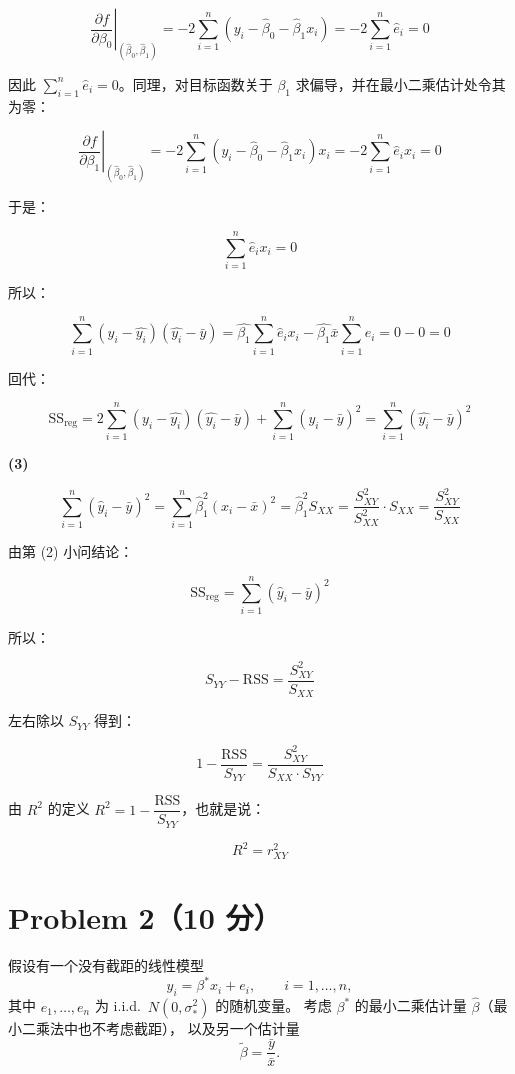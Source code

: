 \documentclass[12pt,a4paper]{article}
\begin{document}
\begin{answerbox}
$$
\left.\frac{\partial f}{\partial\beta_0}\right|_{(\hat\beta_0,\hat\beta_1)}
=-2\sum_{i=1}^n(y_i-\hat\beta_0-\hat\beta_1x_i)
=-2\sum_{i=1}^n\hat{e}_i=0
$$

因此 $\sum_{i=1}^n\hat{e}_i=0$。同理，对目标函数关于 $\beta_1$ 求偏导，并在最小二乘估计处令其为零：

$$
\left.\frac{\partial f}{\partial\beta_1}\right|_{(\hat\beta_0,\hat\beta_1)} =-2\sum_{i=1}^n (y_i-\hat\beta_0-\hat\beta_1x_i)x_i =-2\sum_{i=1}^n \hat{e}_ix_i = 0
$$

于是：

$$
\sum_{i=1}^n \hat{e}_ix_i = 0
$$

所以：

$$
\sum_{i=1}^{n}(y_i-\hat{y_i})(\hat{y_i}-\bar{y})
=\hat{\beta_1}\sum_{i=1}^{n}\hat{e}_ix_i - \hat{\beta_1}\bar{x}\sum_{i=1}^{n}\hat{e_i}
=0-0=0
$$

回代：

$$
\mathrm{SS}_{\mathrm{reg}}= 2 \sum_{i=1}^{n}(y_i-\hat{y_i})(\hat{y_i}-\bar{y}) + \sum_{i=1}^{n}(\hat{y_i}-\bar{y})^2=\sum_{i=1}^{n}(\hat{y_i}-\bar{y})^2
$$

\textbf{(3)}

$$
\sum_{i=1}^{n}(\hat{y}_i-\bar{y})^2=\sum_{i=1}^{n}\hat{\beta}_1^2(x_i-\bar{x})^2=\hat{\beta}_1^2 S_{XX}=\frac{S_{XY}^2}{S_{XX}^2}\cdot S_{XX}=\frac{S_{XY}^2}{S_{XX}}
$$

由第 (2) 小问结论：

$$
\mathrm{SS}_{\mathrm{reg}} = \sum_{i=1}^{n}(\hat{y}_i-\bar{y})^2
$$


所以：

$$
S_{YY}-\mathrm{RSS}=\frac{S_{XY}^2}{S_{XX}}
$$

左右除以 $S_{YY}$ 得到：

$$
1-\frac{\mathrm{RSS}}{S_{YY}}=\frac{S_{XY}^2}{S_{XX}\cdot S_{YY}}
$$

由 $R^2$ 的定义 $R^2=1-\dfrac{\mathrm{RSS}}{S_{YY}}$，也就是说：

$$
R^2=r^2_{XY}
$$

\end{answerbox}


\section{Problem 2（10 分）}

假设有一个没有截距的线性模型
\[
  y_i=\beta^*x_i+e_i,\qquad i=1,\ldots,n,
\]
其中 $e_1,\ldots,e_n$ 为 i.i.d.\ $N(0,\sigma_*^2)$ 的随机变量。
考虑 $\beta^*$ 的最小二乘估计量 $\hat{\beta}$（最小二乘法中也不考虑截距），
以及另一个估计量
\[
  \widetilde{\beta}=\frac{\bar{y}}{\bar{x}}.
\]
\end{document}
